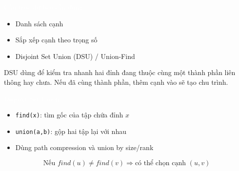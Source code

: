 \documentclass{beamer}
\newcommand{\hlblue}[1]{\textcolor{myblue}{#1}}
\newcommand{\hlgreen}[1]{\textcolor{mygreen}{#1}}
\newcommand{\hlwhite}[1]{\textcolor{white}{#1}}
\begin{document}

\begin{frame}{\hlwhite{Cấu trúc dữ liệu cần dùng}}
\begin{itemize}
\item Danh sách cạnh
\item Sắp xếp cạnh theo trọng số
\item \hlblue{Disjoint Set Union (DSU) / Union-Find}
\end{itemize}

\begin{tcolorbox}[title=\textbf{\hlwhite{Vai trò của DSU}}]
DSU dùng để kiểm tra nhanh hai đỉnh đang thuộc cùng một thành phần liên thông hay chưa.
Nếu đã cùng thành phần, thêm cạnh vào sẽ tạo chu trình.
\end{tcolorbox}
\end{frame}


\begin{frame}{\hlwhite{Disjoint Set Union}}
\begin{itemize}
\item \texttt{find(x)}: tìm gốc của tập chứa đỉnh $x$
\item \texttt{union(a,b)}: gộp hai tập lại với nhau
\item Dùng \hlgreen{path compression} và \hlgreen{union by size/rank}
\end{itemize}

\begin{tcolorbox}
\centering
\[
\text{Nếu } find(u) \neq find(v) \Rightarrow \text{có thể chọn cạnh } (u,v)
\]
\end{tcolorbox}
\end{frame}

\end{document}
